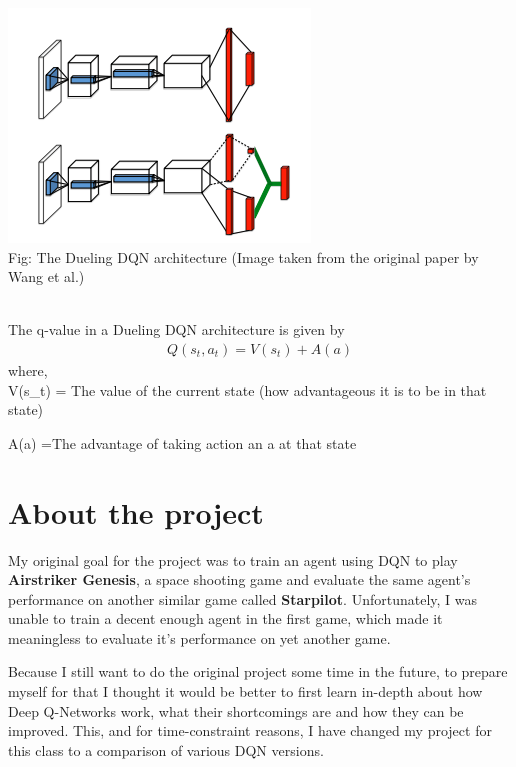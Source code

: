 \documentclass[paper=a4, fontsize=11pt, margin=1in]{scrartcl}
\numberwithin{equation}{section}		%
\numberwithin{figure}{section}			%
\numberwithin{table}{section}				%
\begin{document}
\begin{itemize}
    \begin{center}
    \includegraphics[scale=0.9]{dueling.png}
    \\
    Fig: The Dueling DQN architecture (Image taken from the original paper by Wang et al.)
    \end{center}\\
    
    The q-value in a Dueling DQN architecture is given by 
    \begin{align}
	Q(s_t, a_t) = V(s_t) + A(a)
    \end{align}
    where,\\
    
\hspace*{10mm}V(s\_t) \hspace*{5mm}= \hspace*{5mm}The value of the current state (how advantageous it is to be in that \hspace*{33mm}state)

\hspace*{10mm}A(a) \hspace*{8mm}=\hspace*{5mm}The advantage of taking action an a at that state

\section{About the project}

My original goal for the project was to train an agent using DQN to play \textbf{Airstriker Genesis}, a space shooting game and evaluate the same agent's performance on another similar game called \textbf{Starpilot}. Unfortunately, I was unable to train a decent enough agent in the first game, which made it meaningless to evaluate it's performance on yet another game. 

Because I still want to do the original project some time in the future, to prepare myself for that I thought it would be better to first learn in-depth about how Deep Q-Networks work, what their shortcomings are and how they can be improved. This, and for time-constraint reasons, I have changed my project for this class to a comparison of various DQN versions.



\end{itemize}
\end{document}
